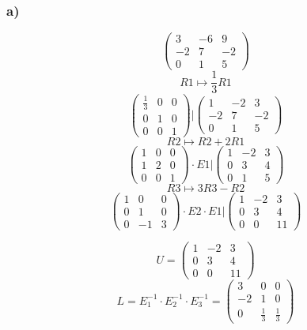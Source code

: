 \documentclass[lineaire_algebra_oplossingen.tex]{subfiles}
\begin{document}
\subsubsection*{a)}
\[
\begin{pmatrix}
3 & -6 & 9\\
-2 & 7 & -2\\
0 & 1 & 5
\end{pmatrix}
\]
\[ R1 \longmapsto \frac{1}{3} R1 \]
\[
\left.\begin{pmatrix}
\frac{1}{3} & 0 & 0\\
0 & 1 & 0\\
0 & 0 & 1
\end{pmatrix}
\right.\Bigg|
\begin{pmatrix}
1 & -2 & 3\\
-2 & 7 & -2\\
0 & 1 & 5
\end{pmatrix}
\]
\[ R2 \longmapsto R2 + 2R1 \]
\[
\left.\begin{pmatrix}
1 & 0 & 0\\
1 & 2 & 0\\
0 & 0 & 1
\end{pmatrix}
\cdot E1
\right.\Bigg|
\begin{pmatrix}
1 & -2 & 3\\
0 & 3 & 4\\
0 & 1 & 5
\end{pmatrix}
\]
\[ R3 \longmapsto 3R3 - R2 \]
\[
\left.\begin{pmatrix}
1 & 0 & 0\\
0 & 1 & 0\\
0 & -1 & 3
\end{pmatrix}
\cdot E2 \cdot E1
\right.\Bigg|
\begin{pmatrix}
1 & -2 & 3\\
0 & 3 & 4\\
0 & 0 & 11
\end{pmatrix}
\]

\[ U = 
\begin{pmatrix}
1 & -2 & 3\\
0 & 3 & 4\\
0 & 0 & 11
\end{pmatrix}
\]
\[ L = E_1^{-1} \cdot E_2^{-1} \cdot E_3^{-1}
= \begin{pmatrix}
3 & 0 & 0\\
-2 & 1 & 0\\
0 & \frac{1}{3} & \frac{1}{3}
\end{pmatrix}
\]
\end{document}
